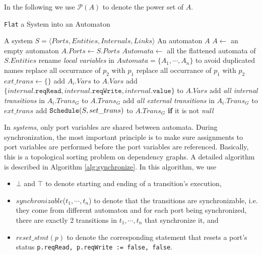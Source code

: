  In the following we use $\mathcal{P}(A)$ to denote the power set of $A$.

\begin{algorithm}[t]
    \caption{\texttt{Flat} a System into an Automaton}
    \label{alg:compose}
    \small
    \begin{algorithmic}[1]
        \REQUIRE A system $S=\langle Ports, Entities, Internals, Links\rangle$
        \ENSURE An automaton $A$
        \STATE $A \leftarrow $ an empty automaton
        \STATE $A.Ports\leftarrow S.Ports$
        \STATE $Automata\leftarrow$ all the flattened automata of $S.Entities$
        \STATE rename \emph{local variables} in $Automata=\{A_1,\cdots,A_n\}$ to avoid duplicated names
                \STATE replace all occurrance of $p_2$ with $p_1$
            \ELSE
                \STATE replace all occurrance of $p_1$ with $p_2$
            \ENDIF
        \ENDFOR
        \STATE $ext\_trans\leftarrow \{\}$
            \STATE add $A_i.Vars$ to $A.Vars$
                \STATE add $\{ internal\texttt{.reqRead}, internal\texttt{.reqWrite}, internal\texttt{.value}\}$ to $A.Vars$
            \ENDFOR
            \STATE add \emph{all internal transitions} in $A_i.Trans_G$ to $A.Trans_G$
            \STATE add \emph{all external transitions} in $A_i.Trans_G$ to $ext\_trans$
        \ENDFOR
            \STATE add $\mbox{\texttt{Schedule}}(S, set\_trans)$ to $A.Trans_G$ \textbf{if} it is not \emph{null}
        \ENDFOR
    \end{algorithmic}
\end{algorithm}

In \lang{} \emph{systems}, only port variables are shared between automata. During synchronization, the most important principle is to make sure assignments to port variables are performed before the port variables are referenced. Basically, this is a topological sorting problem on dependency graphs. A detailed algorithm is described in Algorithm \ref{alg:synchronize}. In this algorithm, we use
\begin{itemize}
    \item $\bot$ and $\top$ to denote starting and ending of a transition's execution, \item $synchronizable$($t_1,\cdots,t_n$) to denote that the transitions are synchronizable, i.e. they come from different automaton and for each port being synchronized, there are exactly 2 transitions in $t_1,\cdots,t_n$ that synchronize it, and
    \item $reset\_stmt(p)$ to denote the corresponding statement that resets a port's status \texttt{p.reqRead, p.reqWrite := false, false}.
\end{itemize}

